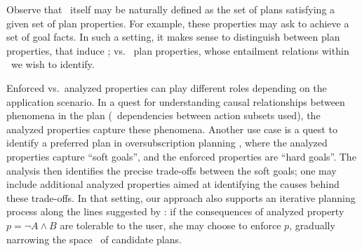 Observe that \plans\ itself may be naturally defined as the set of
plans satisfying a given set of plan properties. For example, these
properties may ask to achieve a set of goal facts. In such a setting,
it makes sense to distinguish between  plan
properties, that induce \plans; vs.\  plan
properties, whose entailment relations within \plans\ we wish to
identify. 

Enforced vs.\ analyzed properties can play different roles depending
on the application scenario. In a quest for understanding causal
relationships between phenomena in the plan (\eg\ dependencies between
action subsets used), the analyzed properties capture these
phenomena. Another use case is a quest to identify a preferred plan in
oversubscription planning
\cite{smith:icaps-04,domshlak:mirkis:jair-15}, where the analyzed
properties capture ``soft goals'', and the enforced properties are
``hard goals''. The analysis then identifies the precise trade-offs
between the soft goals; one may include additional analyzed properties
aimed at identifying the causes behind these trade-offs. In that
setting, our approach also supports an iterative planning process
along the lines suggested by \cite{smith:aaai-12}: if the consequences
of analyzed property $p = \neg A \wedge B$ are tolerable to the user,
she may choose to enforce $p$, gradually narrowing the space
\plans\ of candidate plans. 




